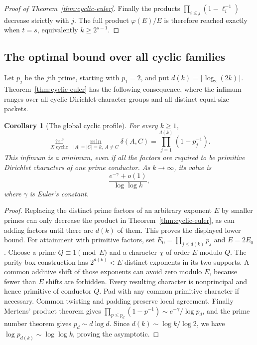 \documentclass[11pt]{article}
\newtheorem{corollary}[theorem]{Corollary}
\theoremstyle{definition}
\theoremstyle{remark}
\begin{document}
\begin{proof}[Proof of Theorem~\ref{thm:cyclic-euler}]
Finally the products $\prod_{i\le j}(1-\ell_i^{-1})$ decrease strictly
with $j$.  The full product $\varphi(E)/E$ is therefore reached exactly
when $t=s$, equivalently $k\ge2^{s-1}$.
\end{proof}

\subsection{The optimal bound over all cyclic families}

Let $p_j$ be the $j$th prime, starting with $p_1=2$, and put
$d(k)=\lfloor\log_2(2k)\rfloor$.  Theorem~\ref{thm:cyclic-euler}
has the following consequence, where the infimum ranges over all
cyclic Dirichlet-character groups and all distinct equal-size packets.

\begin{corollary}[The global cyclic profile]\label{cor:global-cyclic}
For every $k\ge1$,
\[
 \inf_{X\text{ cyclic}}\ \min_{|A|=|C|=k,\ A\ne C}\delta(A,C)
 =\prod_{j=1}^{d(k)}(1-p_j^{-1}).
\]
This infimum is a minimum, even if all the factors are required to
be primitive Dirichlet characters of one prime conductor.  As
$k\to\infty$, its value is
\[
 \frac{e^{-\gamma}+o(1)}{\log\log k},
\]
where $\gamma$ is Euler's constant.
\end{corollary}

\begin{proof}
Replacing the distinct prime factors of an arbitrary exponent $E$
by smaller primes can only decrease the product in
Theorem~\ref{thm:cyclic-euler}, as can adding factors until there are
$d(k)$ of them.  This proves the displayed lower bound.  For
attainment with primitive factors, set
$E_0=\prod_{j\le d(k)}p_j$ and $E=2E_0$.
Choose a prime $Q\equiv1\pmod E$ and a character $\chi$ of order $E$
modulo $Q$.  The parity-box construction has $2^{d(k)}<E$ distinct
exponents in its two supports.  A common additive shift of those
exponents can avoid zero modulo $E$, because fewer than $E$ shifts
are forbidden.  Every resulting character is nonprincipal and hence
primitive of conductor $Q$.  Pad with any common primitive character
if necessary.  Common twisting and padding preserve local agreement.
Finally Mertens' product theorem \cite[Eq.~(3)]{mertensmodern} gives
$\prod_{p\le p_d}(1-p^{-1})\sim e^{-\gamma}/\log p_d$,
and the prime number theorem gives $p_d\sim d\log d$.
Since $d(k)\sim\log k/\log2$, we have
$\log p_{d(k)}\sim\log\log k$, proving the asymptotic.
\end{proof}
\end{document}
